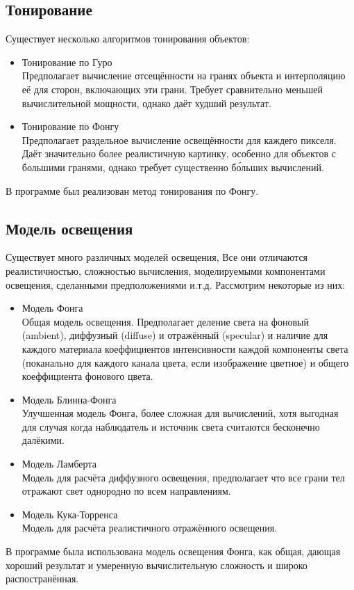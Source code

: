 \documentclass[a4paper,12pt]{report}
\begin{document}
\subsection{Тонирование}
Существует несколько алгоритмов тонирования объектов:
\begin{itemize}
\item Тонирование по Гуро \\
Предполагает вычисление отсещённости на гранях объекта и интерполяцию её для сторон, включающих эти грани. Требует сравнительно меньшей вычислительной мощности, однако даёт худший результат.
\item Тонирование по Фонгу \\
Предполагает раздельное вычисление освещённости для каждего пикселя. Даёт значительно более реалистичную картинку, особенно для объектов с большими гранями, однако требует существенно б\'{о}льших вычислений.
\end{itemize}
В программе был реализован метод тонирования по Фонгу.


\subsection{Модель освещения}
Существует много различных моделей освещения, Все они отличаются реалистичностью, сложностью вычисления, моделируемыми компонентами освещения, сделанными предположениями и.т.д. Рассмотрим некоторые из них:
\begin{itemize}
\item Модель Фонга \\
Общая модель освещения. Предполагает деление света на фоновый (ambient), диффузный (diffuse) и отражённый (specular) и наличие для каждого материала коеффициентов интенсивности каждой компоненты света (поканально для каждого канала цвета, если изображение цветное) и общего коеффициента фонового цвета.
\item Модель Блинна-Фонга \\
Улучшенная модель Фонга, более сложная для вычислений, хотя выгодная для случая когда наблюдатель и источник света считаются бесконечно далёкими.
\item Модель Ламберта \\
Модель для расчёта диффузного освещения, предполагает что все грани тел отражают свет однородно по всем направлениям.
\item Модель Кука-Торренса \\
Модель для расчёта реалистичного отражённого освещения.
\end{itemize}
В программе была использована модель освещения Фонга, как общая, дающая хороший результат и умеренную вычислительную сложность и широко распостранённая.
\end{document}
